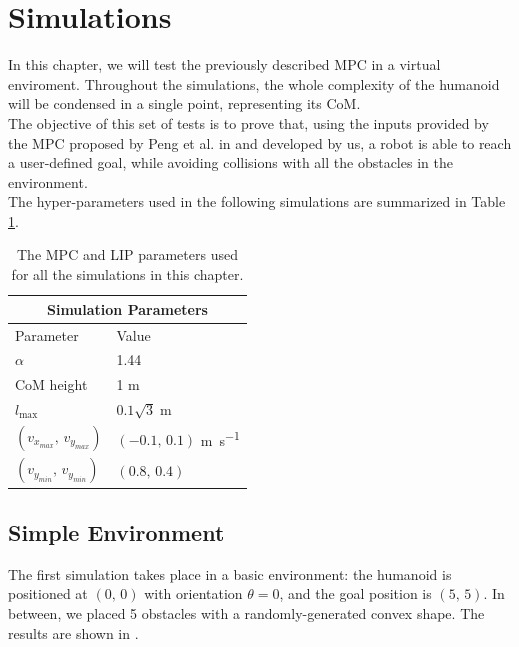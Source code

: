 \documentclass[main.tex]{subfiles}
\begin{document}
\section{Simulations}\label{sec:simulations}

In this chapter, we will test the previously described MPC in a virtual enviroment. Throughout the simulations, the whole complexity of the humanoid will be condensed in a single point, representing its CoM.\\
The objective of this set of tests is to prove that, using the inputs provided by the MPC proposed by Peng et al. in \cite{peng_main_paper} and developed by us, a robot is able to reach a user-defined goal, while avoiding collisions with all the obstacles in the environment.\\
The hyper-parameters used in the following simulations are summarized in Table \ref{table:sim_params}.

\begin{table}[h]
    \begin{tabular}{ |p{3cm}||p{4cm}| }
         \hline
         \multicolumn{2}{|c|}{Simulation Parameters} \\
         \hline
         Parameter& Value\\
         \hline
         $\alpha$   & 1.44 \\
         CoM height & 1 \si{\meter} \\
         $l_{\max}$ & $0.1 \sqrt{3} \;\si{\meter}$ \\
         $\left( v_{x_{max}},\, v_{y_{max}} \right)$ & $\left( -0.1,\, 0.1 \right)$ \si{\meter\per\second}\\
         $\left( v_{y_{min}},\, v_{y_{min}} \right)$ & $\left( 0.8,\, 0.4 \right)$ \\
         \hline
    \end{tabular}
\centering
\caption{The MPC and LIP parameters used for all the simulations in this chapter. }
\label{table:sim_params}
\end{table}

\subsection{Simple Environment}
The first simulation takes place in a basic environment: the humanoid is positioned at $(0,\,0)$ with orientation $\theta = 0$, and the goal position is $(5,\,5)$. In between, we placed 5 obstacles with a randomly-generated convex shape. The results are shown in . %
\end{document}
